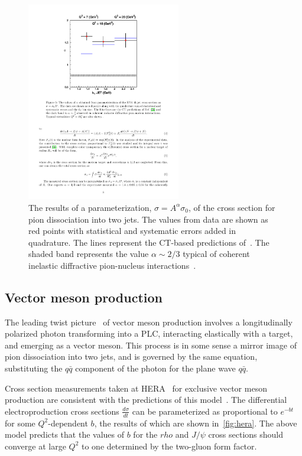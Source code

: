 \begin{figure}[!h]
    \centering
    \includegraphics[width=0.6\textwidth]{chap2/pion_dijet_alpha.pdf}
    \caption{The results of a parameterization, $\sigma=A^\alpha\sigma_0$, of
             the cross section for pion dissociation into two jets.
             The values from data are shown as red points with statistical and
             systematic errors added in quadrature.
             The lines represent the CT-based predictions
             of~\cite{Frankfurt_1993}.
             The shaded band represents the value $\alpha\sim2/3$ typical of
             coherent inelastic diffractive pion-nucleus
             interactions~\cite{Zielinsk_1983}.
            }
    \label{fig:pion_dijet_alpha}
\end{figure}



\subsection{Vector meson production}
The leading twist picture~\cite{Brodsky_1994} of vector meson production
involves a longitudinally polarized photon transforming into a PLC, interacting
elastically with a target, and emerging as a vector meson.
This process is in some sense a mirror image of pion dissociation into two jets,
and is governed by the same equation, substituting the $q\bar{q}$ component of
the photon for the plane wave $q\bar{q}$.


Cross section measurements taken at HERA~\cite{Chekanov_2004, Chekanov_2007}
for exclusive vector meson production are consistent with the predictions of
this model~\cite{Frankfurt_2005}.
The differential electroproduction cross sections $\frac{d\sigma}{dt}$ can be
parameterized as proportional to $e^{-bt}$ for some $Q^2$-dependent $b$, the
results of which are shown in~\ref{fig:hera}.
The above model predicts that the values of $b$ for the $rho$ and $J/\psi$
cross sections should converge at large $Q^2$ to one determined by the
two-gluon form factor.

